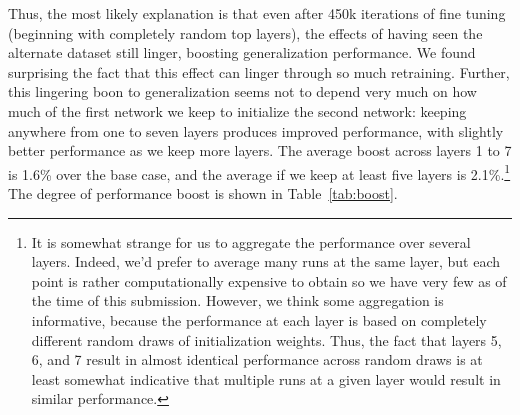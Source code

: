 \begin{enumerate}
Thus, the most likely explanation is that even after 450k iterations of fine tuning (beginning with completely random top layers), the effects of having seen the alternate dataset still linger, boosting generalization performance. We found surprising the fact that this effect can linger through so much retraining. Further, this lingering boon to generalization seems not to depend very much on how much of the first network we keep to initialize the second network: keeping anywhere from one to seven layers produces improved performance, with slightly better performance as we keep more layers. The average boost across layers 1 to 7 is 1.6\% over the base case, and the average if we keep at least five layers is 2.1\%.\footnote{It is somewhat strange for us to aggregate the performance over several layers. Indeed, we'd prefer to average many runs at the same layer, but each point is rather computationally expensive to obtain so we have very few as of the time of this submission. However, we think some aggregation is informative, because the performance at each layer is based on completely different random draws of initialization weights. Thus, the fact that layers 5, 6, and 7 result in almost identical performance across random draws is at least somewhat indicative that multiple runs at a given layer would result in similar performance.} The degree of performance boost is shown in Table~\ref{tab:boost}.

\end{enumerate}

%
% 
% 
% 


